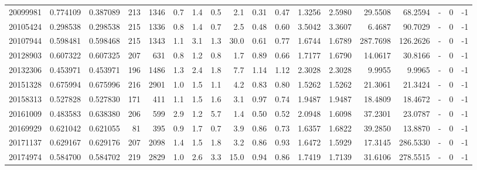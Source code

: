 \begin{tabular}{rrrrrrrrrrrrrrrlrr}
  20099981 & 0.774109 &   0.387089 &  213 & 1346 &      0.7 &      1.4 &     0.5 &      2.1 &       0.31 &        0.47 &  1.3256 &  2.5980 &   29.5508 &   68.2594 &             - &        0 &         -1 \\
  20105424 & 0.298538 &   0.298538 &  215 & 1336 &      0.8 &      1.4 &     0.7 &      2.5 &       0.48 &        0.60 &  3.5042 &  3.3607 &    6.4687 &   90.7029 &             - &        0 &         -1 \\
  20107944 & 0.598481 &   0.598468 &  215 & 1343 &      1.1 &      3.1 &     1.3 &     30.0 &       0.61 &        0.77 &  1.6744 &  1.6789 &  287.7698 &  126.2626 &             - &        0 &         -1 \\
  20128903 & 0.607322 &   0.607325 &  207 &  631 &      0.8 &      1.2 &     0.8 &      1.7 &       0.89 &        0.66 &  1.7177 &  1.6790 &   14.0617 &   30.8166 &             - &        0 &         -1 \\
  20132306 & 0.453971 &   0.453971 &  196 & 1486 &      1.3 &      2.4 &     1.8 &      7.7 &       1.14 &        1.12 &  2.3028 &  2.3028 &    9.9955 &    9.9965 &             - &        0 &         -1 \\
  20151328 & 0.675994 &   0.675996 &  216 & 2901 &      1.0 &      1.5 &     1.1 &      4.2 &       0.83 &        0.80 &  1.5262 &  1.5262 &   21.3061 &   21.3424 &             - &        0 &         -1 \\
  20158313 & 0.527828 &   0.527830 &  171 &  411 &      1.1 &      1.5 &     1.6 &      3.1 &       0.97 &        0.74 &  1.9487 &  1.9487 &   18.4809 &   18.4672 &             - &        0 &         -1 \\
  20161009 & 0.483583 &   0.638380 &  206 &  599 &      2.9 &      1.2 &     5.7 &      1.4 &       0.50 &        0.52 &  2.0948 &  1.6098 &   37.2301 &   23.0787 &             - &        0 &         -1 \\
  20169929 & 0.621042 &   0.621055 &   81 &  395 &      0.9 &      1.7 &     0.7 &      3.9 &       0.86 &        0.73 &  1.6357 &  1.6822 &   39.2850 &   13.8870 &             - &        0 &         -1 \\
  20171137 & 0.629167 &   0.629176 &  207 & 2098 &      1.4 &      1.5 &     1.8 &      3.2 &       0.86 &        0.93 &  1.6472 &  1.5929 &   17.3145 &  286.5330 &             - &        0 &         -1 \\
  20174974 & 0.584700 &   0.584702 &  219 & 2829 &      1.0 &      2.6 &     3.3 &     15.0 &       0.94 &        0.86 &  1.7419 &  1.7139 &   31.6106 &  278.5515 &             - &        0 &         -1 \\

\end{tabular}
